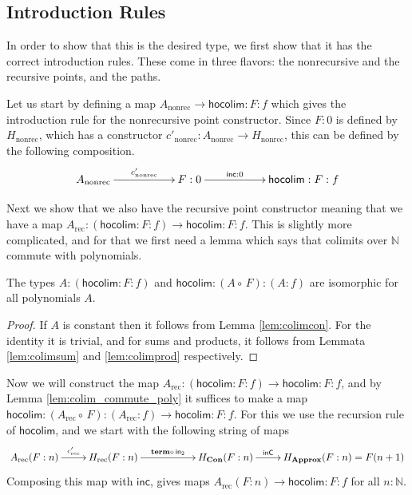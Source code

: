 \documentclass[a4paper,UKenglish]{lipics-v2016}
\newcommand{\Boperator}[1]{\mathsf{#1}}
\newcommand{\inn}{\Boperator{in}}
\newcommand{\comp}[0]{\circ \,}
\newcommand{\rec}[0]{\operatorname{rec}}
\newcommand{\nonrec}[0]{\operatorname{nonrec}}
\newcommand{\term}[0]{\textbf{term}}
\newcommand{\Con}[0]{\textbf{Con}}
\newcommand{\Approx}[0]{\textbf{Approx}}
\newcommand{\inC}[0]{\Boperator{inC}}
\newcommand{\hocolim}[0]{\Boperator{hocolim}}
\newcommand{\inc}[0]{\Boperator{inc}}
\begin{document}
\subsection{Introduction Rules}
In order to show that this is the desired type, we first show that it has the correct introduction rules.
These come in three flavors: the nonrecursive and the recursive points, and the paths.

Let us start by defining a map $A_{\nonrec} \rightarrow \hocolim : F : f$ which gives the introduction rule for the nonrecursive point constructor.
Since $F : 0$ is defined by $H_{\nonrec}$, which has a constructor $c'_{\nonrec} : A_{\nonrec} \rightarrow H_{\nonrec}$, this can be defined by the following composition.
\[
\xymatrix
{
        A_{\nonrec} \ar[rr]^-{c'_{\nonrec}}
                & & F : 0 \ar[rr]^-{\inc : 0}
                & & \hocolim : F : f
}
\]

Next we show that we also have the recursive point constructor meaning that we have a map $A_{\rec} : (\hocolim : F : f) \rightarrow \hocolim : F : f$.
This is slightly more complicated, and for that we first need a lemma which says that colimits over $\mathbb{N}$ commute with polynomials.

\begin{lemma}
\label{lem:colim_commute_poly}
The types $A : (\hocolim : F : f)$ and $\hocolim : (A \comp F) : (A : f)$ are isomorphic for all polynomials $A$.
\end{lemma}

\begin{proof}
If $A$ is constant then it follows from Lemma \ref{lem:colimcon}.
For the identity it is trivial, and for sums and products, it follows from Lemmata \ref{lem:colimsum} and \ref{lem:colimprod} respectively. 
\end{proof}

Now we will construct the map $A_{\rec} : (\hocolim : F : f) \rightarrow \hocolim : F : f$, and by Lemma \ref{lem:colim_commute_poly} it suffices to make a map $\hocolim : (A_{\rec} \comp F) : (A_{\rec} : f) \rightarrow \hocolim : F : f$.
For this we use the recursion rule of $\hocolim$, and we start with the following string of maps
\[
\xymatrix
{
                A_{\rec}(F : n) \ar[r]^-{c_{\rec}'} 
                & H_{\rec}(F : n) \ar[rr]^-{\term \comp \inn_2} &
                & H_{\Con}(F : n) \ar[r]^-{\inC}
                & H_{\Approx}(F : n) = F(n + 1)
}
\]
Composing this map with $\inc$, gives maps $A_{\rec}(F : n) \rightarrow \hocolim : F : f$ for all $n : \mathbb{N}$.
\end{document}
